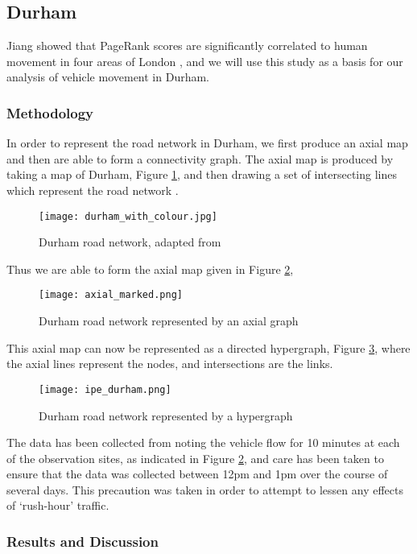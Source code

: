\documentclass[11pt]{report}
\begin{document}
\subsection{Durham} \label{sec:durham}
Jiang showed that PageRank scores are significantly correlated to human movement in four areas of London \cite{doi:10.1080/13658810802022822}, and we will use this study as a basis for our analysis of vehicle movement in Durham. 
\subsubsection{Methodology}
In order to represent the road network in Durham, we first produce an axial map and then are able to form a connectivity graph. The axial map is produced by taking a map of Durham, Figure \ref{fig:durham map}, and then drawing a set of intersecting lines which represent the road network \cite{Axialmap40:online}.
\begin{figure}
\centering
\texttt{[image: durham\_with\_colour.jpg]}
\caption{Durham road network, adapted from \cite{undergraduate}}
\label{fig:durham map}
\end{figure} 
Thus we are able to form the axial map given in Figure \ref{fig:durham axial},  \begin{figure}
\centering
\texttt{[image: axial\_marked.png]}
\caption{Durham road network represented by an axial graph}
\label{fig:durham axial}
\end{figure}
This axial map can now be represented as a directed hypergraph, Figure \ref{fig:durham graph}, where the axial lines represent the nodes, and intersections are the links. 
\begin{figure}
\centering
\texttt{[image: ipe\_durham.png]}
\caption{Durham road network represented by a hypergraph}
\label{fig:durham graph}
\end{figure}
The data has been collected from noting the vehicle flow for 10 minutes at each of the observation sites, as indicated in Figure \ref{fig:durham axial}, and care has been taken to ensure that the data was collected between 12pm and 1pm over the course of several days. This precaution was taken in order to attempt to lessen any effects of `rush-hour' traffic.
\FloatBarrier
\subsubsection{Results and Discussion} \label{sec:results}
\end{document}
